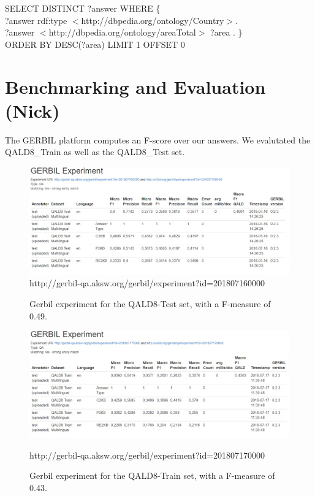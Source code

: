 \documentclass[runningheads]{llncs}
\begin{document}
\raggedbottom
\begin{example}
	SELECT DISTINCT ?answer WHERE \{ \\
	\tab[1.8cm] ?answer rdf:type $<$http://dbpedia.org/ontology/Country$>$. \\
	\tab[1.8cm] ?answer $<$http://dbpedia.org/ontology/areaTotal$>$ ?area . \} \\
	\tab[1.8cm]	ORDER BY DESC(?area) LIMIT 1 OFFSET 0\end{example}

\pagebreak
\section{Benchmarking and Evaluation (Nick)} 

The GERBIL platform computes an F-score over our answers. We evalutated the QALD8\_Train as well as the QALD8\_Test set.

\begin{figure}[H]
	\includegraphics[width=\textwidth]{QALD-8-Test.PNG}
	http://gerbil-qa.aksw.org/gerbil/experiment?id=201807160000
	\caption{Gerbil experiment for the QALD8-Test set, with a F-measure of 0.49.}
	\label{fig2} 
\end{figure}


\begin{figure}
	\includegraphics[width=\textwidth]{QALD-8-Train.PNG}
	
	http://gerbil-qa.aksw.org/gerbil/experiment?id=201807170000
	\caption{Gerbil experiment for the QALD8-Train set, with a F-measure of 0.43.}
	\label{fig3} 
\end{figure}
\end{document}
